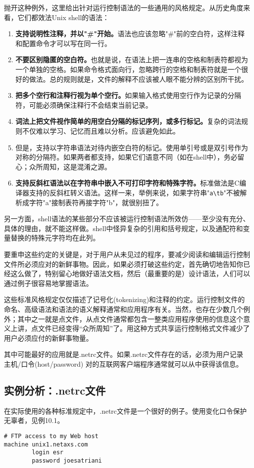 \documentclass[12pt,oneside]{book}
\begin{document}
\begin{common-format}
抛开这种例外，这里给出针对运行控制语法的一些通用的风格规定。从历史角度来看，它们都效法Unix shell的语法：
\begin{enumerate}
\item \textbf{支持说明性注释，并以"\#{}"开始。}语法也应该忽略"\#{}"前的空白符，这样注释和配置命令才可以写在同一行。
\item \textbf{不要区别隐匿的空白符。}也就是说，在语法上把一连串的空格和制表符都视为一个单独的空格。如果命令格式面向行，忽略跨行的空格和制表符就是一个很好的做法。总的规则就是，文件的解释不应该被人眼不能分辨的区别所干扰。
\item \textbf{把多个空行和注释行视为单个空行。}如果输入格式使用空行作为记录的分隔符，可能必须确保注释行不会结束当前记录。
\item \textbf{词法上把文件视作简单的用空白分隔的标记序列，或多行标记。}复杂的词法规则不仅难以学习、记忆而且难以分析。应该避免如此。
\item 但是，支持以字符串语法对待内嵌空白符的标记。使用单引号或是双引号作为对称的分隔符。如果两者都支持，如果它们语意不同（如在shell中），务必留心；众所周知，这是混淆之源。
\item \textbf{支持反斜杠语法以在字符串中嵌入不可打印字符和特殊字符。}标准做法是C编译器支持的反斜杠转义语法。这样一来，举例来说，如果字符串"\verb+a\tb+"不被解析成字符"a"接制表符再接字符"b"，就很别扭了。
\end{enumerate}

另一方面，shell语法的某些部分不应该被运行控制语法所效仿——至少没有充分、具体的理由，就不能这样做。shell中怪异复杂的引用和括号规定，以及通配符和变量替换的特殊元字符均在此列。

要重申这些约定的关键是，对于用户从未见过的程序，要减少阅读和编辑运行控制文件所必须应对的新鲜事物。因此，如果必须打破这些约定，首先确切地告知你已经这么做了，特别留心地做好语法文档，然后（最重要的是）设计语法，人们可以通过例子很容易地掌握语法。

这些标准风格规定仅仅描述了记号化(tokenizing)和注释的约定。运行控制文件的命名、高级语法和语法的语义解释通常和应用程序有关。当然，也存在少数几个例外；其中之一就是点文件，从点文件通常都包含一整类应用程序使用的信息这个意义上讲，点文件已经变得“众所周知”了。用这种方式共享运行控制格式文件减少了用户必须应付的新鲜事物量。

其中可能最好的应用就是.netrc文件。如果.netrc文件存在的话，必须为用户记录主机/口令(host/password) 对的互联网客户端程序通常就可以从中获得该信息。


\subsection{实例分析：.netrc文件}
在实际使用的各种标准规定中，.netrc文件是一个很好的例子。使用变化口令保护无辜者，见例10.1。
\begin{Verbatim}[label=例10.1 .netrc例子]
# FTP access to my Web host
machine unix1.netaxs.com
        login esr
        password joesatriani


\end{Verbatim}
\end{common-format}
\end{document}
